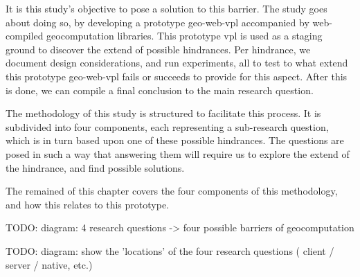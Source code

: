 It is this study's objective to pose a solution to this barrier. 
The study goes about doing so, by developing a prototype \ac{geo-web-vpl} accompanied by web-compiled geocomputation libraries. 
This prototype vpl is used as a staging ground to discover the extend of possible hindrances. 
Per hindrance, we document design considerations, and run experiments, all to test to what extend this prototype \ac{geo-web-vpl} fails or succeeds to provide for this aspect. 
After this is done, we can compile a final conclusion to the main research question. 

The methodology of this study is structured to facilitate this process. 
It is subdivided into four components, each representing a sub-research question, which is in turn based upon one of these possible hindrances. The questions are posed in such a way that answering them will require us to explore the extend of the hindrance, and find possible solutions.

The remained of this chapter covers the four components of this methodology, and how this relates to this prototype. 

\begin{note}
TODO: diagram: 4 research questions -> four possible barriers of geocomputation
\end{note}

\begin{note}
TODO: diagram: show the 'locations' of the four research questions ( client / server / native, etc.)
\end{note}


\section{\mySubRQOneTitle} 
\label{sec:method-one}

